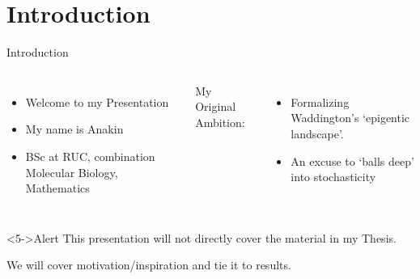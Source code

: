 \documentclass[aspectratio=169, onlytextwidth,  notheorems, sOuRcEs, fleqn, leqno, ]{RUCPresentation}
\begin{document}
\section{Introduction}
\begin{frame}{Introduction}

    \vspace{2em}


    \begin{columns}[T]

        \column{0.50\framewidth}
        \begin{itemize}
            \item Welcome to my Presentation
            \item My name is Anakin
            \item<3-> BSc  at RUC, combination Molecular Biology, Mathematics
        \end{itemize}

        My Original Ambition:
        \begin{itemize}
            \item Formalizing Waddington's `epigentic landscape'.%
            \item An excuse to `balls deep' into stochasticity
        \end{itemize}
    \end{columns}

    \begin{alertblock}<5->{Alert}
        This presentation will not directly cover the material in my Thesis.\par
        We will cover motivation/inspiration and tie it to results.
    \end{alertblock}

\end{frame}



\end{document}

